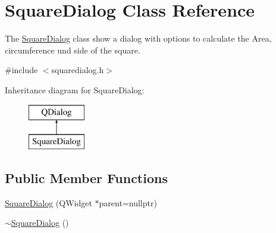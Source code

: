 \hypertarget{class_square_dialog}{}\section{Square\+Dialog Class Reference}
\label{class_square_dialog}


The \mbox{\hyperlink{class_square_dialog}{Square\+Dialog}} class show a dialog with options to calculate the Area, circumference und side of the square.  




{\ttfamily \#include $<$squaredialog.\+h$>$}

Inheritance diagram for Square\+Dialog\+:\begin{figure}[H]
\begin{center}
\leavevmode
\includegraphics[height=2.000000cm]{class_square_dialog}
\end{center}
\end{figure}
\subsection*{Public Member Functions}
\begin{DoxyCompactItemize}
\item 
\mbox{\hyperlink{class_square_dialog_a091517384d35fe4fbc444ed34a6ba303}{Square\+Dialog}} (Q\+Widget $\ast$parent=nullptr)
\item 
\mbox{\hyperlink{class_square_dialog_a8129e6dc415aea3fca385ac775e32c71}{$\sim$\+Square\+Dialog}} ()
\end{DoxyCompactItemize}
